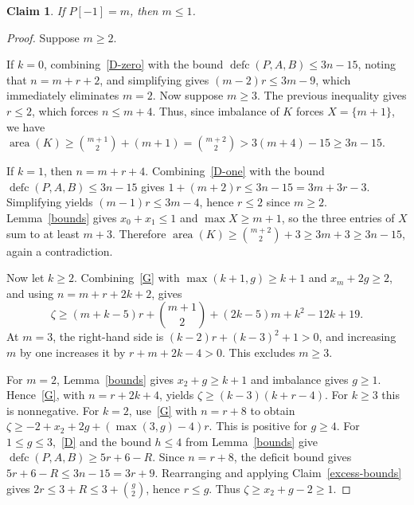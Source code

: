 \documentclass[11pt]{article}
\DeclareMathOperator{\area}{area}\DeclareMathOperator{\dinv}{dinv}
\DeclareMathOperator{\defc}{defc}\DeclareMathOperator{\sym}{sym}
\newtheorem{claim}{Claim}
\begin{document}
\begin{claim}\label{maximum-height}
If $P[-1]=m$, then $m\le1$.
\end{claim}
\begin{proof}
Suppose $m\ge2$. 

If $k=0$, combining~\eqref{D-zero} with the bound $\defc(P,A,B)\le3n-15$, noting that $n=m+r+2$, and simplifying gives $(m-2)r\le3m-9$, which immediately eliminates $m=2$. Now suppose $m\ge3$. The previous inequality gives $r\le2$, which forces $n\le m+4$. Thus, since imbalance of $K$ forces $X=\{m+1\}$, we have
$\area(K)\ge\binom{m+1}2+(m+1)=\binom{m+2}2>3(m+4)-15\ge3n-15$.

If $k=1$, then $n=m+r+4$. Combining~\eqref{D-one} with the bound $\defc(P,A,B)\le3n-15$ gives $1+(m+2)r\le3n-15=3m+3r-3$. Simplifying yields $(m-1)r\le3m-4$, hence $r\le2$ since $m\ge2$. Lemma~\ref{bounds} gives $x_0+x_1\le1$ and $\max X\ge m+1$, so the three entries of $X$ sum to at least $m+3$. Therefore
$\area(K)\ge\binom{m+2}2+3\ge3m+3\ge3n-15$, again a contradiction.

Now let $k\ge2$. Combining~\eqref{G} with $\max(k+1,g)\ge k+1$ and $x_m+2g\ge2$, and using $n=m+r+2k+2$, gives
\[
 \zeta\ge(m+k-5)r+\binom{m+1}2+(2k-5)m+k^2-12k+19.
\]
At $m=3$, the right-hand side is $(k-2)r+(k-3)^2+1>0$, and increasing $m$ by one increases it by $r+m+2k-4>0$. This excludes $m\ge3$.

For $m=2$, Lemma~\ref{bounds} gives $x_2+g\ge k+1$ and imbalance gives $g \ge 1$. Hence~\eqref{G}, with $n=r+2k+4$, yields
$\zeta\ge(k-3)(k+r-4)$. For  $k \ge3$ this is nonnegative. For $k=2$, use~\eqref{G} with $n=r+8$  to obtain $
 \zeta\ge-2+x_2+2g+(\max(3,g)-4)r$.
This is positive for $g\ge4$. For $1\le g\le3$,~\eqref{D} and the bound $h\le4$ from Lemma~\ref{bounds} give $\defc(P,A,B)\ge 5r+6-R$. Since $n=r+8$, the deficit bound gives $5r+6-R\le3n-15=3r+9$. Rearranging and applying Claim~\ref{excess-bounds} gives $2r\le3+R\le3+\binom g2$, hence $r\le g$. Thus
$\zeta\ge x_2+g-2\ge1$.
\end{proof}
\end{document}
